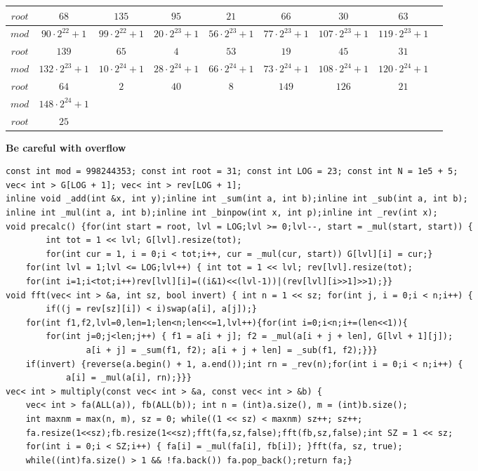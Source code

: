 \documentclass[12pt]{article}
\begin{document}
\begin{tabular}{|c|c|c|c|c|c|c|c|c|}
$root$& $68$& $135$& $95$& $21$& $66$& $30$& $63$\\
\hline


$mod$& $90\cdot 2^{22}+1$& $99\cdot 2^{22}+1$& $20\cdot 2^{23}+1$& $56\cdot 2^{23}+1$& $77\cdot 2^{23}+1$& $107\cdot 2^{23}+1$& $119\cdot 2^{23}+1$\\
\hline

$root$& $139$& $65$& $4$& $53$& $19$& $45$& $31$\\
\hline


$mod$& $132\cdot 2^{23}+1$& $10\cdot 2^{24}+1$& $28\cdot 2^{24}+1$& $66\cdot 2^{24}+1$& $73\cdot 2^{24}+1$& $108\cdot 2^{24}+1$& $120\cdot 2^{24}+1$\\
\hline

$root$& $64$& $2$& $40$& $8$& $149$& $126$& $21$\\
\hline


$mod$& $148\cdot 2^{24}+1$\\
\hline

$root$& $25$\\
\hline
\end{tabular}

{\bf Be careful with overflow}

\begin{verbatim}
const int mod = 998244353; const int root = 31; const int LOG = 23; const int N = 1e5 + 5;
vec< int > G[LOG + 1]; vec< int > rev[LOG + 1];
inline void _add(int &x, int y);inline int _sum(int a, int b);inline int _sub(int a, int b);
inline int _mul(int a, int b);inline int _binpow(int x, int p);inline int _rev(int x);
void precalc() {for(int start = root, lvl = LOG;lvl >= 0;lvl--, start = _mul(start, start)) {
        int tot = 1 << lvl; G[lvl].resize(tot);
        for(int cur = 1, i = 0;i < tot;i++, cur = _mul(cur, start)) G[lvl][i] = cur;}
    for(int lvl = 1;lvl <= LOG;lvl++) { int tot = 1 << lvl; rev[lvl].resize(tot);
    for(int i=1;i<tot;i++)rev[lvl][i]=((i&1)<<(lvl-1))|(rev[lvl][i>>1]>>1);}}
void fft(vec< int > &a, int sz, bool invert) { int n = 1 << sz; for(int j, i = 0;i < n;i++) {
        if((j = rev[sz][i]) < i)swap(a[i], a[j]);}
    for(int f1,f2,lvl=0,len=1;len<n;len<<=1,lvl++){for(int i=0;i<n;i+=(len<<1)){
        for(int j=0;j<len;j++) { f1 = a[i + j]; f2 = _mul(a[i + j + len], G[lvl + 1][j]);
                a[i + j] = _sum(f1, f2); a[i + j + len] = _sub(f1, f2);}}}
    if(invert) {reverse(a.begin() + 1, a.end());int rn = _rev(n);for(int i = 0;i < n;i++) {
            a[i] = _mul(a[i], rn);}}}
vec< int > multiply(const vec< int > &a, const vec< int > &b) {
    vec< int > fa(ALL(a)), fb(ALL(b)); int n = (int)a.size(), m = (int)b.size();
    int maxnm = max(n, m), sz = 0; while((1 << sz) < maxnm) sz++; sz++;
    fa.resize(1<<sz);fb.resize(1<<sz);fft(fa,sz,false);fft(fb,sz,false);int SZ = 1 << sz;
    for(int i = 0;i < SZ;i++) { fa[i] = _mul(fa[i], fb[i]); }fft(fa, sz, true);
    while((int)fa.size() > 1 && !fa.back()) fa.pop_back();return fa;}
\end{verbatim}
\end{document}
